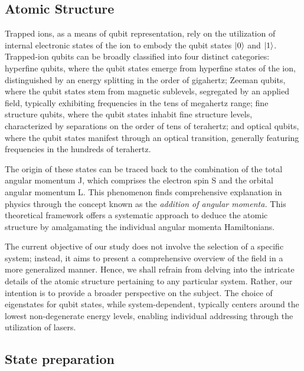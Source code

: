 \documentclass[
  journal=largetwo,
  year=2023,
]{cup-journal}
\begin{document}
\subsection{Atomic Structure}

Trapped ions, as a means of qubit representation, rely on the utilization of internal electronic states of the ion to embody the qubit states \(\ket{0}\) and \(\ket{1}\). Trapped-ion qubits can be broadly classified into four distinct categories: hyperfine qubits, where the qubit states emerge from hyperfine states of the ion, distinguished by an energy splitting in the order of gigahertz; Zeeman qubits, where the qubit states stem from magnetic sublevels, segregated by an  applied field, typically exhibiting frequencies in the tens of megahertz range; fine structure qubits, where the qubit states inhabit fine structure levels, characterized by separations on the order of tens of terahertz; and optical qubits, where the qubit states manifest through an optical transition, generally featuring frequencies in the hundreds of terahertz.~\autocite{mattos_2023_estudo}

The origin of these states can be traced back to the combination of the total angular momentum J, which comprises the electron spin S and the orbital angular momentum L. This phenomenon finds comprehensive explanation in physics through the concept known as the {\it addition of angular momenta.} This theoretical framework offers a systematic approach to deduce the atomic structure by amalgamating the individual angular momenta Hamiltonians.

The current objective of our study does not involve the selection of a specific system; instead, it aims to present a comprehensive overview of the field in a more generalized manner. Hence, we shall refrain from delving into the intricate details of the atomic structure pertaining to any particular system. Rather, our intention is to provide a broader perspective on the subject. The choice of eigenstates for qubit states, while system-dependent, typically centers around the lowest non-degenerate energy levels, enabling individual addressing through the utilization of lasers.

\subsection{State preparation}
\end{document}
